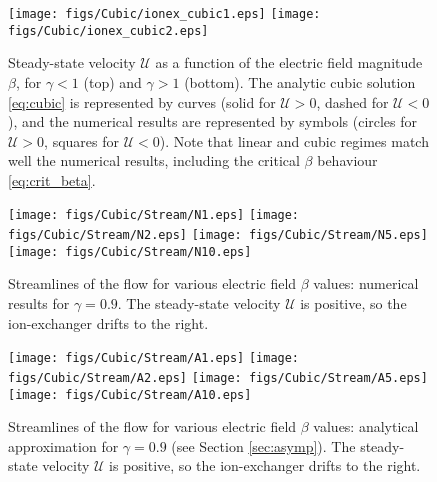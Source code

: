 \documentclass[MSc,beforeExam]{iitcsthesis}
\newcommand\cU{\mathscr{U}}
\begin{document}
\begin{figure}
    \begin{center}
    \texttt{[image: figs/Cubic/ionex\_cubic1.eps]}
    \texttt{[image: figs/Cubic/ionex\_cubic2.eps]}
        \caption[Ion exchanger steady-state velocity]{
        Steady-state velocity $\cU$ as a function of the 
        electric field magnitude $\beta$, for $\gamma < 1$ (top) and $\gamma > 1$ (bottom). 
        The analytic cubic solution \eqref{eq:cubic} is represented by curves
        (solid for $\cU > 0$, dashed for $\cU < 0$), 
        and the numerical results are represented by symbols 
        (circles for $\cU > 0$, squares for $\cU < 0$). Note that linear and
        cubic regimes match well the numerical results, including the critical $\beta$ 
        behaviour \eqref{eq:crit_beta}. 
        }
	    \label{fig:IonExCubic}
    \end{center}
\end{figure}

\begin{figure}
    \begin{center}
	\texttt{[image: figs/Cubic/Stream/N1.eps]}
	\texttt{[image: figs/Cubic/Stream/N2.eps]}
	\texttt{[image: figs/Cubic/Stream/N5.eps]}
	\texttt{[image: figs/Cubic/Stream/N10.eps]}
        \caption[Ion exchanger streamlines -- numerical results]{
        Streamlines of the flow for various electric field $\beta$ values: 
        numerical results for $\gamma = 0.9$.  
        The steady-state velocity $\cU$ is positive, so the
        ion-exchanger drifts to the right. }
    \label{fig:Vortex1}
    \end{center}
\end{figure}

\begin{figure}
    \begin{center}
	\texttt{[image: figs/Cubic/Stream/A1.eps]}
	\texttt{[image: figs/Cubic/Stream/A2.eps]}
	\texttt{[image: figs/Cubic/Stream/A5.eps]}
	\texttt{[image: figs/Cubic/Stream/A10.eps]}
        \caption[Ion exchanger streamlines -- analytical results]{
        Streamlines of the flow for various electric field $\beta$ values: 
        analytical approximation for $\gamma = 0.9$ (see Section \ref{sec:asymp}).
        The steady-state velocity $\cU$ is positive, so the
        ion-exchanger drifts to the right.}
    \label{fig:Vortex2}
    \end{center}
\end{figure}
\end{document}
